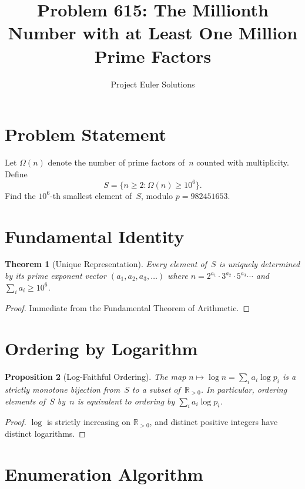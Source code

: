 \documentclass[11pt]{article}
\title{Problem 615: The Millionth Number with at Least One Million Prime Factors}
\author{Project Euler Solutions}
\date{}
\newtheorem{theorem}{Theorem}
\newtheorem{proposition}[theorem]{Proposition}
\begin{document}
\maketitle

\section{Problem Statement}

Let $\Omega(n)$ denote the number of prime factors of~$n$ counted with multiplicity. Define
\[
S = \{n \ge 2 : \Omega(n) \ge 10^6\}.
\]
Find the $10^6$-th smallest element of~$S$, modulo $p = 982451653$.

\section{Fundamental Identity}

\begin{theorem}[Unique Representation]
Every element of~$S$ is uniquely determined by its prime exponent vector $(a_1, a_2, a_3, \ldots)$ where $n = 2^{a_1} \cdot 3^{a_2} \cdot 5^{a_3} \cdots$ and $\sum_i a_i \ge 10^6$.
\end{theorem}

\begin{proof}
Immediate from the Fundamental Theorem of Arithmetic.
\end{proof}

\section{Ordering by Logarithm}

\begin{proposition}[Log-Faithful Ordering]
The map $n \mapsto \log n = \sum_i a_i \log p_i$ is a strictly monotone bijection from~$S$ to a subset of~$\mathbb{R}_{>0}$. In particular, ordering elements of~$S$ by~$n$ is equivalent to ordering by $\sum_i a_i \log p_i$.
\end{proposition}

\begin{proof}
$\log$ is strictly increasing on $\mathbb{R}_{>0}$, and distinct positive integers have distinct logarithms.
\end{proof}

\section{Enumeration Algorithm}
\end{document}
